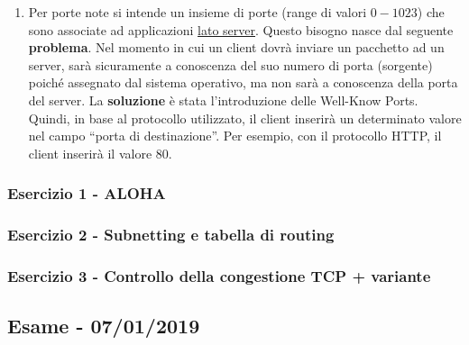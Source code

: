 \documentclass[a4paper]{article}
\newcommand{\dquotes}[1]{``#1''}
\begin{document}
\begin{enumerate}
		\item Per porte note si intende un insieme di porte (range di valori $0-1023$) che sono associate ad applicazioni \underline{lato server}. Questo bisogno nasce dal seguente \textbf{problema}.\newline
		Nel momento in cui un client dovrà inviare un pacchetto ad un server, sarà sicuramente a conoscenza del suo numero di porta (sorgente) poiché assegnato dal sistema operativo, ma non sarà a conoscenza della porta del server.\newline
		La \textbf{soluzione} è stata l'introduzione delle Well-Know Ports. Quindi, in base al protocollo utilizzato, il client inserirà un determinato valore nel campo \dquotes{porta di destinazione}. Per esempio, con il protocollo HTTP, il client inserirà il valore 80.\label{Well-Known Ports}
	\end{enumerate}
	
	\subsubsection{Esercizio 1 - ALOHA}
	
	\subsubsection{Esercizio 2 - Subnetting e tabella di routing}
	
	\subsubsection{Esercizio 3 - Controllo della congestione TCP + variante}
	
	\newpage

	\subsection[\textbf{Esame - 07/01/2019}]{Esame - 07/01/2019}
\end{document}
